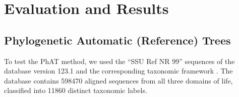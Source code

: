 
\section{Evaluation and Results}
\label{ch:AutomaticTrees:sec:Evaluation}


\subsection{Phylogenetic Automatic (Reference) Trees}
\label{ch:AutomaticTrees:sec:Evaluation:sub:AutomaticTrees}

To test the \acf{PhAT} method,
we used the ``SSU Ref NR 99'' sequences of the  database \citep{Quast2013} version 123.1
and the corresponding taxonomic framework \citep{Yilmaz2014}.
The database contains \num{598 470} aligned sequences from all three domains of life,
classified into \num{11 860} distinct taxonomic labels.

